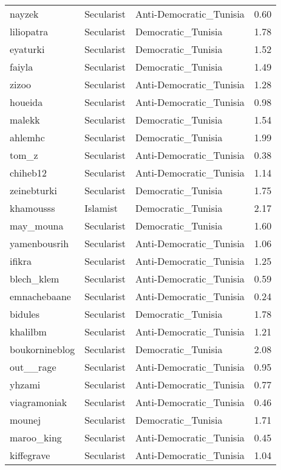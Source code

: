 \begin{longtable}{llll}
  nayzek & Secularist & Anti-Democratic\_Tunisia & 0.60 \\ 
  liliopatra & Secularist & Democratic\_Tunisia & 1.78 \\ 
  eyaturki & Secularist & Democratic\_Tunisia & 1.52 \\ 
  faiyla & Secularist & Democratic\_Tunisia & 1.49 \\ 
  zizoo & Secularist & Anti-Democratic\_Tunisia & 1.28 \\ 
  houeida & Secularist & Anti-Democratic\_Tunisia & 0.98 \\ 
  malekk & Secularist & Democratic\_Tunisia & 1.54 \\ 
  ahlemhc & Secularist & Democratic\_Tunisia & 1.99 \\ 
  tom\_z & Secularist & Anti-Democratic\_Tunisia & 0.38 \\ 
  chiheb12 & Secularist & Anti-Democratic\_Tunisia & 1.14 \\ 
  zeinebturki & Secularist & Democratic\_Tunisia & 1.75 \\ 
  khamousss & Islamist & Democratic\_Tunisia & 2.17 \\ 
  may\_mouna & Secularist & Democratic\_Tunisia & 1.60 \\ 
  yamenbousrih & Secularist & Anti-Democratic\_Tunisia & 1.06 \\ 
  ifikra & Secularist & Anti-Democratic\_Tunisia & 1.25 \\ 
  blech\_klem & Secularist & Anti-Democratic\_Tunisia & 0.59 \\ 
  emnachebaane & Secularist & Anti-Democratic\_Tunisia & 0.24 \\ 
  bidules & Secularist & Democratic\_Tunisia & 1.78 \\ 
  khalilbm & Secularist & Anti-Democratic\_Tunisia & 1.21 \\ 
  boukornineblog & Secularist & Democratic\_Tunisia & 2.08 \\ 
  out\_\_rage & Secularist & Anti-Democratic\_Tunisia & 0.95 \\ 
  yhzami & Secularist & Anti-Democratic\_Tunisia & 0.77 \\ 
  viagramoniak & Secularist & Anti-Democratic\_Tunisia & 0.46 \\ 
  mounej & Secularist & Democratic\_Tunisia & 1.71 \\ 
  maroo\_king & Secularist & Anti-Democratic\_Tunisia & 0.45 \\ 
  kiffegrave & Secularist & Anti-Democratic\_Tunisia & 1.04 \\ 

\end{longtable}
